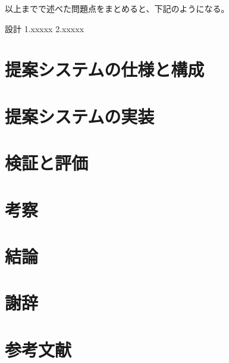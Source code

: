 \documentclass[a4paper]{jreport}
\begin{document}
以上までで述べた問題点をまとめると、下記のようになる。

設計
1.xxxxx
2.xxxxx

\chapter{提案システムの仕様と構成}

\chapter{提案システムの実装}

\chapter{検証と評価}

\chapter{考察}
\chapter{結論}
\chapter{謝辞}
\chapter{参考文献}
\end{document}
